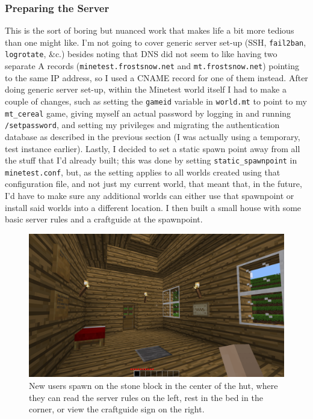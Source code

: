 \documentclass{article}
\begin{document}
\subsubsection{Preparing the Server}
This is the sort of boring but nuanced work that makes life a bit more tedious than one might like.  I'm not going to cover generic server set-up (SSH, \texttt{fail2ban}, \texttt{logrotate}, \&c.) besides noting that DNS did not seem to like having two separate A records (\texttt{minetest.frostsnow.net} and \texttt{mt.frostsnow.net}) pointing to the same IP address, so I used a CNAME record for one of them instead.  After doing generic server set-up, within the Minetest world itself I had to make a couple of changes, such as setting the \texttt{gameid} variable in \texttt{world.mt} to point to my \texttt{mt_cereal} game, giving myself an actual password by logging in and running \texttt{/setpassword}, and setting my privileges and migrating the authentication database as described in the previous section (I was actually using a temporary, test instance earlier).  Lastly, I decided to set a static spawn point away from all the stuff that I'd already built; this was done by setting \texttt{static_spawnpoint} in \texttt{minetest.conf}, but, as the setting applies to all worlds created using that configuration file, and not just my current world, that meant that, in the future, I'd have to make sure any additional worlds can either use that spawnpoint or install said worlds into a different location.  I then built a small house with some basic server rules and a craftguide at the spawnpoint.

\begin{figure}
\begin{center}
\includegraphics[scale=0.25]{files/blog/2019_07_20_minetest_5_0_1_upgrade_and_server_hosting/2019_07_20_starting_hut.png}
\caption{New users spawn on the stone block in the center of the hut, where they can read the server rules on the left, rest in the bed in the corner, or view the craftguide sign on the right.}
\end{center}
\end{figure}
\end{document}
